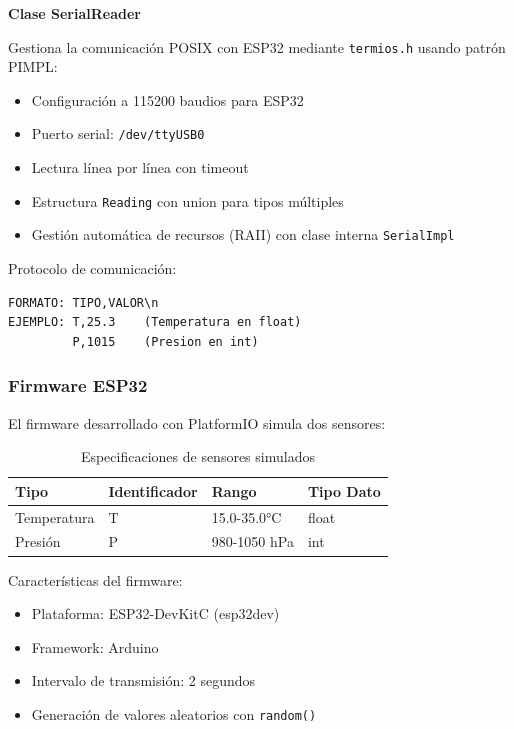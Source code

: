 \documentclass[conference]{IEEEtran}
\begin{document}
\textbf{Clase SerialReader}

Gestiona la comunicación POSIX con ESP32 mediante \texttt{termios.h} usando patrón PIMPL:

\begin{itemize}
    \item Configuración a 115200 baudios para ESP32
    \item Puerto serial: \texttt{/dev/ttyUSB0}
    \item Lectura línea por línea con timeout
    \item Estructura \texttt{Reading} con union para tipos múltiples
    \item Gestión automática de recursos (RAII) con clase interna \texttt{SerialImpl}
\end{itemize}

Protocolo de comunicación:

\vspace{0.2cm}
\begin{verbatim}
FORMATO: TIPO,VALOR\n
EJEMPLO: T,25.3    (Temperatura en float)
         P,1015    (Presion en int)
\end{verbatim}
\vspace{0.3cm}

\subsubsection{Firmware ESP32}

El firmware desarrollado con PlatformIO simula dos sensores:

\begin{table}[h]
\centering
\caption{Especificaciones de sensores simulados}
\label{tab:sensores}
\begin{tabular}{|l|l|l|l|}
\hline
\textbf{Tipo} & \textbf{Identificador} & \textbf{Rango} & \textbf{Tipo Dato} \\ \hline
Temperatura & T & 15.0-35.0°C & float \\ \hline
Presión & P & 980-1050 hPa & int \\ \hline
\end{tabular}
\end{table}

Características del firmware:
\begin{itemize}
    \item Plataforma: ESP32-DevKitC (esp32dev)
    \item Framework: Arduino
    \item Intervalo de transmisión: 2 segundos
    \item Generación de valores aleatorios con \texttt{random()}
\end{itemize}
\end{document}
